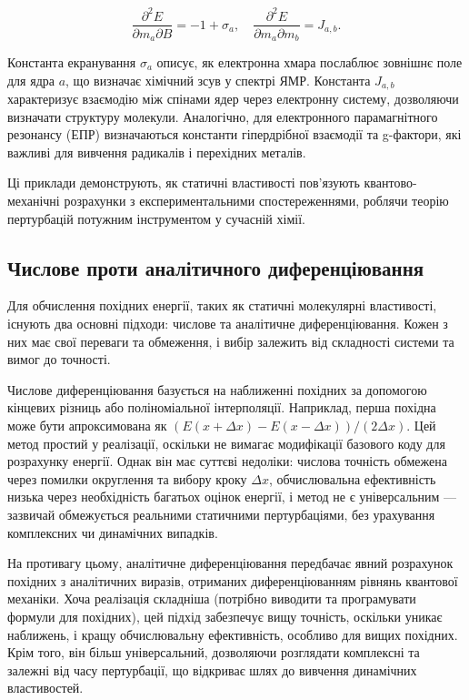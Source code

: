 \documentclass{PySCFBook}
\begin{document}
\[
\frac{\partial^2 E}{\partial m_a \partial B} = -1 + \sigma_a, \quad \frac{\partial^2 E}{\partial m_a \partial m_b} = J_{a,b}.
\]

Константа екранування \(\sigma_a\) описує, як електронна хмара послаблює зовнішнє поле для ядра \(a\), що визначає хімічний зсув у спектрі ЯМР. Константа \(J_{a,b}\) характеризує взаємодію між спінами ядер через електронну систему, дозволяючи визначати структуру молекули. Аналогічно, для електронного парамагнітного резонансу (ЕПР) визначаються константи гіпердрібної взаємодії та g-фактори, які важливі для вивчення радикалів і перехідних металів.

Ці приклади демонструють, як статичні властивості пов'язують квантово-механічні розрахунки з експериментальними спостереженнями, роблячи теорію пертурбацій потужним інструментом у сучасній хімії.

\subsection{Числове проти аналітичного диференціювання}

Для обчислення похідних енергії, таких як статичні молекулярні властивості, існують два основні підходи: числове та аналітичне диференціювання. Кожен з них має свої переваги та обмеження, і вибір залежить від складності системи та вимог до точності.

Числове диференціювання базується на наближенні похідних за допомогою кінцевих різниць або поліноміальної інтерполяції. Наприклад, перша похідна може бути апроксимована як \((E(x + \Delta x) - E(x - \Delta x))/(2 \Delta x)\). Цей метод простий у реалізації, оскільки не вимагає модифікації базового коду для розрахунку енергії. Однак він має суттєві недоліки: числова точність обмежена через помилки округлення та вибору кроку \(\Delta x\), обчислювальна ефективність низька через необхідність багатьох оцінок енергії, і метод не є універсальним — зазвичай обмежується реальними статичними пертурбаціями, без урахування комплексних чи динамічних випадків.

На противагу цьому, аналітичне диференціювання передбачає явний розрахунок похідних з аналітичних виразів, отриманих диференціюванням рівнянь квантової механіки. Хоча реалізація складніша (потрібно виводити та програмувати формули для похідних), цей підхід забезпечує вищу точність, оскільки уникає наближень, і кращу обчислювальну ефективність, особливо для вищих похідних. Крім того, він більш універсальний, дозволяючи розглядати комплексні та залежні від часу пертурбації, що відкриває шлях до вивчення динамічних властивостей.
\end{document}
